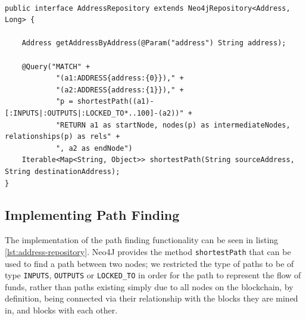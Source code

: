 \begin{lstlisting}[label={lst:address-repository}, caption={AddressRepository interface definition}, breaklines=true, basicstyle=\small]

public interface AddressRepository extends Neo4jRepository<Address, Long> {

    Address getAddressByAddress(@Param("address") String address);

    @Query("MATCH" +
            "(a1:ADDRESS{address:{0}})," +
            "(a2:ADDRESS{address:{1}})," +
            "p = shortestPath((a1)-[:INPUTS|:OUTPUTS|:LOCKED_TO*..100]-(a2))" +
            "RETURN a1 as startNode, nodes(p) as intermediateNodes, relationships(p) as rels" +
            ", a2 as endNode")
    Iterable<Map<String, Object>> shortestPath(String sourceAddress, String destinationAddress);
}
\end{lstlisting}

\subsection{Implementing Path Finding}
The implementation of the path finding functionality can be seen in listing \ref{lst:address-repository}. Neo4J provides the method \texttt{shortestPath} that can be used to find a path between two nodes; we restricted the type of paths to be of type \texttt{INPUTS}, \texttt{OUTPUTS} or \texttt{LOCKED\_TO} in order for the path to represent the flow of funds, rather than paths existing simply due to all nodes on the blockchain, by definition, being connected via their relationship with the blocks they are mined in, and blocks with each other. 
